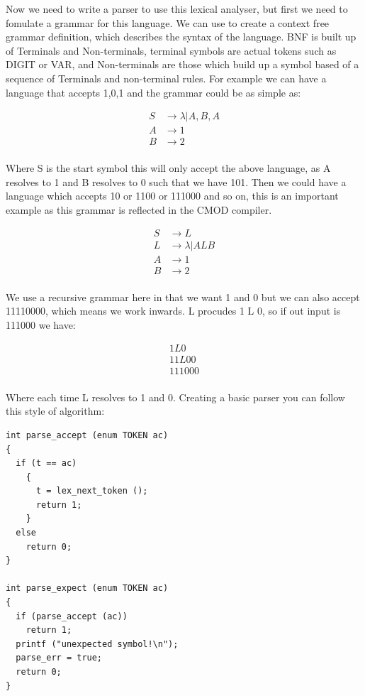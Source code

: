 \documentclass[defaultstyle,11pt]{article}
\begin{document}
Now we need to write a parser to use this lexical analyser, but first we need to fomulate a grammar for this language. We can use
 to create a context free grammar definition, which describes the syntax
of the language. BNF is built up of Terminals and Non-terminals, terminal symbols are actual tokens such as DIGIT or VAR, and Non-terminals
are those which build up a symbol based of a sequence of Terminals and non-terminal rules. For example we can have a language that accepts
1,0,1 and the grammar could be as simple as:

\begin{align*}
S &\to \lambda | A , B , A \\
A &\to 1 \\
B &\to 2 \\
\end{align*}

Where S is the start symbol this will only accept the above language, as A resolves to 1 and B resolves to 0 such that we have 101. Then we could
have a language which accepts 10 or 1100 or 111000 and so on, this is an important example as this grammar is reflected in the CMOD compiler.

\begin{align*}
S &\to  L \\
L &\to \lambda | A L B \\
A &\to 1 \\
B &\to 2 \\
\end{align*}

We use a recursive grammar here in that we want 1 and 0 but we can also accept 11110000, which means we work inwards.
L procudes 1 L 0, so if out input is 111000 we have:

\begin{align*}
1 L 0 \\
1 1 L 0 0 \\
1 1 1 0 0 0 \\
\end{align*}

Where each time L resolves to 1 and 0. Creating a basic parser you can follow this style of algorithm:

\begin{lstlisting}
int parse_accept (enum TOKEN ac)
{
  if (t == ac)
    {
      t = lex_next_token ();
      return 1;
    }
  else
    return 0;
}

int parse_expect (enum TOKEN ac)
{
  if (parse_accept (ac))
    return 1;
  printf ("unexpected symbol!\n");
  parse_err = true;
  return 0;
}
\end{lstlisting}
\end{document}
